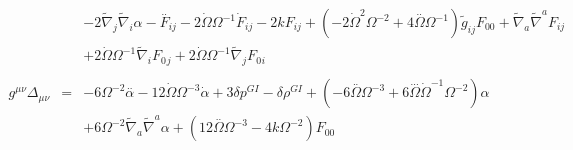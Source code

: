 \documentclass[10pt,letterpaper]{article}
\numberwithin{equation}{section}
\begin{document}
\begin{eqnarray}
&& - 2 \tilde{\nabla}_{j}\tilde{\nabla}_{i}\alpha - \overset{..}{F}_{ij} - 2 \dot{\Omega} \Omega^{-1} \dot{F}_{ij} - 2 k F_{ij} + (-2 \dot{\Omega}^2 \Omega^{-2} + 4 \overset{..}{\Omega} \Omega^{-1}) \tilde{g}_{ij} F_{00}{} + \tilde{\nabla}_{a}\tilde{\nabla}^{a}F_{ij} \nonumber \\ 
&& + 2 \dot{\Omega} \Omega^{-1} \tilde{\nabla}_{i}F_{0}{}_{j} + 2 \dot{\Omega} \Omega^{-1} \tilde{\nabla}_{j}F_{0}{}_{i}
\\  \nonumber\\ 
g^{\mu\nu}\Delta_{\mu\nu}&=& -6 \Omega^{-2} \overset{..}{\alpha} - 12 \dot{\Omega} \Omega^{-3} \dot{\alpha} + 3 \delta p^{GI}{} -  \delta \rho^{GI}{} + (-6 \overset{..}{\Omega} \Omega^{-3} + 6 \overset{...}{\Omega} \dot{\Omega}^{-1} \Omega^{-2}) \alpha \nonumber \\ 
&& + 6 \Omega^{-2} \tilde{\nabla}_{a}\tilde{\nabla}^{a}\alpha +(12 \overset{..}{\Omega} \Omega^{-3} - 4 k \Omega^{-2}) F_{00}{}
\end{eqnarray}
%
%
\end{document}
